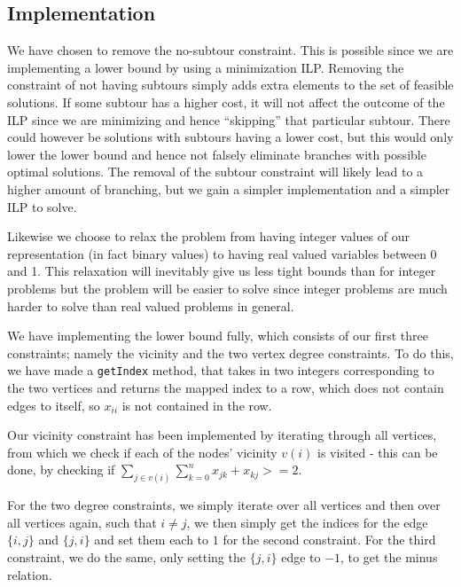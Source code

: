 \subsection{Implementation}
We have chosen to remove the no-subtour constraint. This is possible since
we are implementing a lower bound by using a minimization ILP. Removing the
constraint of not having subtours simply adds extra elements to the set of
feasible solutions. If some subtour has a higher cost, it will not affect
the outcome of the ILP since we are minimizing and hence ``skipping'' that
particular subtour. There could however be solutions with subtours having a
lower cost, but this would only lower the lower bound and hence not falsely
eliminate branches with possible optimal solutions. The removal of the subtour
constraint will likely lead to a higher amount of branching, but we gain a
simpler implementation and a simpler ILP to solve.

Likewise we choose to relax the problem from having integer values of our
representation (in fact binary values) to having real valued variables between
0 and 1. This relaxation will inevitably give us less tight bounds than
for integer problems but the problem will be easier to solve since integer
problems are much harder to solve than real valued problems in general.

We have implementing the lower bound fully, which consists of our first three
constraints; namely the vicinity and the two vertex degree constraints. To
do this, we have made a \texttt{getIndex} method, that takes in two integers
corresponding to the two vertices and returns the mapped index to a row, which
does not contain edges to itself, so $x_{ii}$ is not contained in the row.

Our vicinity constraint has been implemented by iterating through all
vertices, from which we check if each of the nodes' vicinity $v(i)$ is visited
- this can be done, by checking if $\sum_{j \in v(i)} \sum_{k=0}^n x_{jk} +
x_{kj} >= 2$.

For the two degree constraints, we simply iterate over all vertices and
then over all vertices again, such that $i \ne j$, we then simply get the
indices for the edge $\{i,j\}$ and $\{j,i\}$ and set them each to $1$ for the
second constraint. For the third constraint, we do the same, only setting the
$\{j,i\}$ edge to $-1$, to get the minus relation.\\

